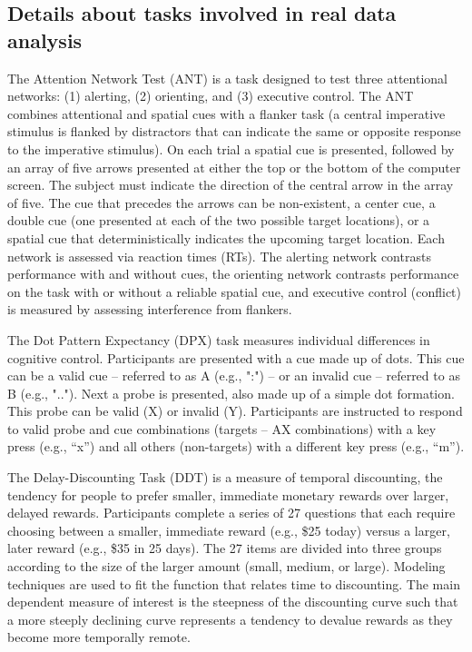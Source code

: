 \documentclass[titlepage,12pt] {article}
\begin{document}
\newpage

\subsection*{Details about tasks involved in real data analysis}


The Attention Network Test (ANT) is a task designed to test three attentional networks: (1) alerting, (2) orienting, and (3) executive control. The ANT combines attentional and spatial cues with a flanker task (a central imperative stimulus is flanked by distractors that can indicate the same or opposite response to the imperative stimulus). On each trial a spatial cue is presented, followed by an array of five arrows presented at either the top or the bottom of the computer screen. The subject must indicate the direction of the central arrow in the array of five. The cue that precedes the arrows can be non-existent, a center cue, a double cue (one presented at each of the two possible target locations), or a spatial cue that deterministically indicates the upcoming target location. Each network is assessed via reaction times (RTs). The alerting network contrasts performance with and without cues, the orienting network contrasts performance on the task with or without a reliable spatial cue, and executive control (conflict) is measured by assessing interference from flankers.

The Dot Pattern Expectancy (DPX) task measures individual differences in cognitive control. Participants are presented with a cue made up of dots. This cue can be a valid cue – referred to as A (e.g., ":") – or an invalid cue – referred to as B (e.g., ".."). Next a probe is presented, also made up of a simple dot formation. This probe can be valid (X) or invalid (Y). Participants are instructed to respond to valid probe and cue combinations (targets – AX combinations) with a key press (e.g., “x”) and all others (non-targets) with a different key press (e.g., “m”).

The Delay-Discounting Task (DDT) is a measure of temporal discounting, the tendency for people to prefer smaller, immediate monetary rewards over larger, delayed rewards. Participants complete a series of 27 questions that each require choosing between a smaller, immediate reward (e.g., \$25 today) versus a larger, later reward (e.g., \$35 in 25 days). The 27 items are divided into three groups according to the size of the larger amount (small, medium, or large). Modeling techniques are used to fit the function that relates time to discounting. The main dependent measure of interest is the steepness of the discounting curve such that a more steeply declining curve represents a tendency to devalue rewards as they become more temporally remote.
\end{document}
